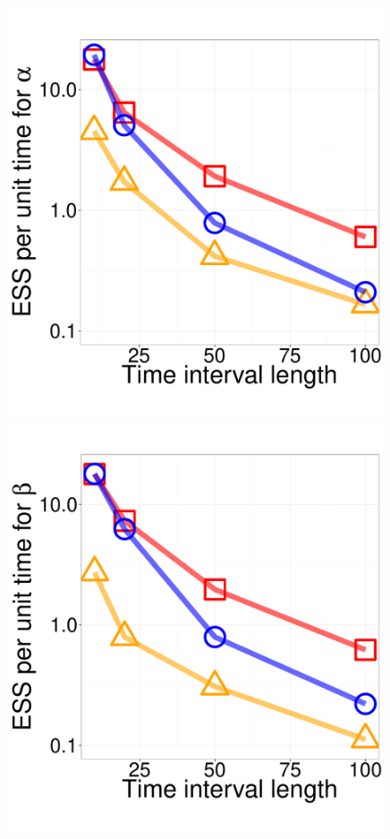 \begin{figure}
\begin{minipage}[hp]{0.24\linewidth}
  \end{minipage}
  \begin{minipage}[hp]{0.24\linewidth}
  \centering
    \includegraphics [width=0.99\textwidth, angle=0]{figs/ESS_vs_t_alpha.pdf}
      \end{minipage}
  \begin{minipage}[hp]{0.24\linewidth}
  \centering
    \includegraphics [width=0.99\textwidth, angle=0]{figs/ESS_vs_t_beta.pdf}

\end{minipage}
\end{figure}
